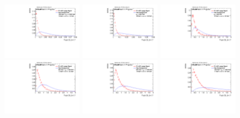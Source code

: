 \begin{figure}
\includegraphics[width=0.3\textwidth]{sascha_input/Appendix/Distributions/w/distributions/beta17/h_normal_tj_C2_17_bin5.pdf} \hspace{1mm}
\includegraphics[width=0.3\textwidth]{sascha_input/Appendix/Distributions/w/distributions/beta17/h_normal_tj_C2_17_bin6.pdf} 
\bigskip
\includegraphics[width=0.3\textwidth]{sascha_input/Appendix/Distributions/w/distributions/beta17/h_normal_tj_D2_17_bin1.pdf} \hspace{1mm}
\includegraphics[width=0.3\textwidth]{sascha_input/Appendix/Distributions/w/distributions/beta17/h_normal_tj_D2_17_bin2.pdf} \hspace{1mm}
\includegraphics[width=0.3\textwidth]{sascha_input/Appendix/Distributions/w/distributions/beta17/h_normal_tj_D2_17_bin3.pdf} 
\bigskip
\includegraphics[width=0.3\textwidth]{sascha_input/Appendix/Distributions/w/distributions/beta17/h_normal_tj_D2_17_bin4.pdf} \hspace{1mm}

\end{figure}
